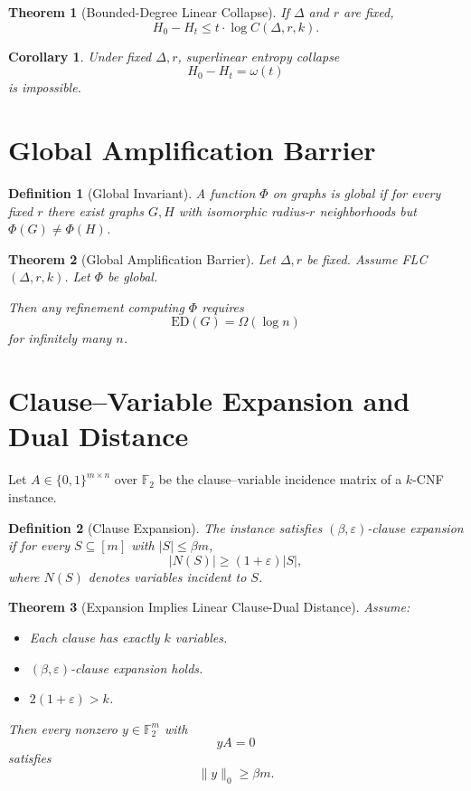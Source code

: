 \documentclass[11pt]{article}
\newtheorem{definition}{Definition}
\newtheorem{theorem}{Theorem}
\newtheorem{corollary}{Corollary}
\newcommand{\ED}{\mathrm{ED}}
\begin{document}
\begin{theorem}[Bounded-Degree Linear Collapse]
If $\Delta$ and $r$ are fixed,
\[
H_0 - H_t
\le
t \cdot \log C(\Delta,r,k).
\]
\end{theorem}

\begin{corollary}
Under fixed $\Delta,r$,
superlinear entropy collapse
\[
H_0 - H_t = \omega(t)
\]
is impossible.
\end{corollary}

\section{Global Amplification Barrier}

\begin{definition}[Global Invariant]
A function $\Phi$ on graphs is global if
for every fixed $r$ there exist graphs $G,H$
with isomorphic radius-$r$ neighborhoods
but $\Phi(G) \ne \Phi(H)$.
\end{definition}

\begin{theorem}[Global Amplification Barrier]
Let $\Delta,r$ be fixed.
Assume FLC$(\Delta,r,k)$.
Let $\Phi$ be global.

Then any refinement computing $\Phi$
requires
\[
\ED(G) = \Omega(\log n)
\]
for infinitely many $n$.
\end{theorem}

\section{Clause--Variable Expansion and Dual Distance}

Let $A \in \{0,1\}^{m \times n}$ over $\mathbb{F}_2$
be the clause--variable incidence matrix of a $k$-CNF instance.

\begin{definition}[Clause Expansion]
The instance satisfies $(\beta,\varepsilon)$-clause expansion if
for every $S \subseteq [m]$ with $|S| \le \beta m$,
\[
|N(S)| \ge (1+\varepsilon)|S|,
\]
where $N(S)$ denotes variables incident to $S$.
\end{definition}

\begin{theorem}[Expansion Implies Linear Clause-Dual Distance]
\label{thm:expansion_dual}
Assume:

\begin{itemize}
\item Each clause has exactly $k$ variables.
\item $(\beta,\varepsilon)$-clause expansion holds.
\item $2(1+\varepsilon) > k$.
\end{itemize}

Then every nonzero $y \in \mathbb{F}_2^m$
with
\[
yA = 0
\]
satisfies
\[
\|y\|_0 \ge \beta m.
\]
\end{theorem}
\end{document}
